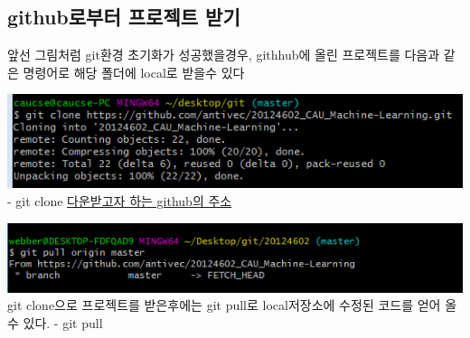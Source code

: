 \documentclass[12pt]{article}
\begin{document}
	\subsection{github로부터 프로젝트 받기}
	앞선 그림처럼 git환경 초기화가 성공했을경우, githhub에 올린 프로젝트를 다음과 같은 명령어로 해당 폴더에 local로 받을수 있다
		\begin{mdframed}[
			linecolor= black,
			roundcorner=10pt,
			innertopmargin =\topskip,
			leftmargin = 0.5cm,
			rightmargin = 0.5cm,
			frametitleaboveskip = 0.5pt,
			frametitlerulewidth = 0.5pt,
			frametitlealignment =,
			frametitlebackgroundcolor = yellow,			
			frametitle = {git으로부터 프로젝트 받기}	]
			\includegraphics[width=\textwidth]{git_clone}
			- git clone  \href{https://github.com/antivec/20124602_CAU_Machine-Learning}{다운받고자 하는 github의 주소}
			
			\includegraphics[width=\textwidth]{git_pull}
			git clone으로 프로젝트를 받은후에는 git pull로 local저장소에 수정된 코드를 얻어 올 수 있다.
			- git pull
		\end{mdframed}
		
\end{document}
